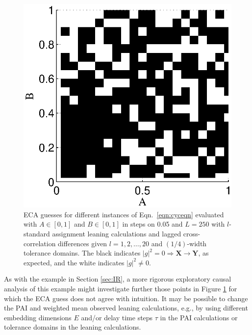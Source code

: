 \begin{figure}[ht]
\begin{center}
\includegraphics[scale=0.8]{NoisyCyclicResponseExample_ECAguessMat.eps} 
\end{center}
\caption{ECA guesses for different instances of Eqn.\ \ref{eqn:cyceqn} evaluated with $A\in[0,1]$ and $B\in[0,1]$ in steps on 0.05 and $L=250$ with $l$-standard assignment leaning calculations and lagged cross-correlation differences given $l=1,2,\ldots,20$ and $(1/4)$-width tolerance domains.  The black indicates $|g|^2=0\Rightarrow\mathbf{X}\rightarrow\mathbf{Y}$, as expected, and the white indicates $|g|^2 \neq 0$.}
\label{fig:cycxyECAguess}
\end{figure}
As with the example in Section \ref{sec:IR}, a more rigorous exploratory causal analysis of this example might investigate further those points in Figure \ref{fig:cycxyECAguess} for which the ECA guess does not agree with intuition.  It may be possible to change the PAI and weighted mean observed leaning calculations, e.g., by using different embedding dimensions $E$ and/or delay time steps $\tau$ in the PAI calculations or tolerance domains in the leaning calculations.  


